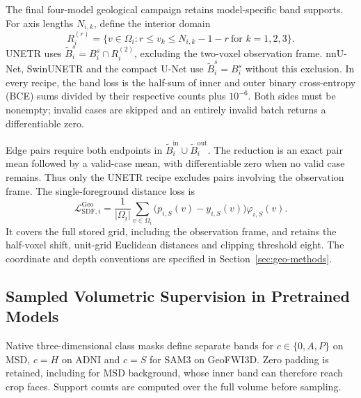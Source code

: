 \documentclass[12pt,a4paper]{article}
\begin{document}
The final four-model geological campaign retains model-specific band
supports. For axis lengths $N_{i,k}$, define the interior domain
\begin{equation}
R_i^{(r)}=\{v\in\Omega_i:
 r\leq v_k\leq N_{i,k}-1-r\ \text{for }k=1,2,3\}.
\label{eq:geological-band-frame}
\end{equation}
UNETR uses $\widetilde B_i^s=B_i^s\cap R_i^{(2)}$, excluding the
two-voxel observation frame. nnU-Net, SwinUNETR and the compact U-Net
use $\widetilde B_i^s=B_i^s$ without this exclusion. In every recipe,
the band loss is the half-sum of inner and outer binary cross-entropy (BCE) sums divided
by their respective counts plus $10^{-6}$. Both sides must be
nonempty; invalid cases are skipped and an entirely invalid batch
returns a differentiable zero.

Edge pairs require both endpoints in
$\widetilde B_i^{\mathrm{in}}\cup\widetilde B_i^{\mathrm{out}}$.
The reduction is an exact pair mean followed by a valid-case mean,
with differentiable zero when no valid case remains. Thus only the
UNETR recipe excludes pairs involving the observation frame.
The single-foreground distance loss is
\begin{equation}
\mathcal{L}_{\mathrm{SDF},i}^{\mathrm{Geo}}
=\frac{1}{|\Omega_i|}\sum_{v\in\Omega_i}
 \bigl(p_{i,S}(v)-y_{i,S}(v)\bigr)\varphi_{i,S}(v).
\label{eq:geological-sdf-loss}
\end{equation}
It covers the full stored grid, including the observation frame,
and retains the half-voxel shift, unit-grid Euclidean distances and
clipping threshold eight. The coordinate and depth conventions are
specified in Section~\ref{sec:geo-methods}.

\subsection{Sampled Volumetric Supervision in Pretrained Models}
\label{sec:sampled-pretrained-supervision}

Native three-dimensional class masks define separate bands for
$c\in\{0,A,P\}$ on MSD, $c=H$ on ADNI and $c=S$ for SAM3 on
GeoFWI3D. Zero padding is retained, including for MSD background,
whose inner band can therefore reach crop faces. Support counts are
computed over the full volume before sampling.
\end{document}
